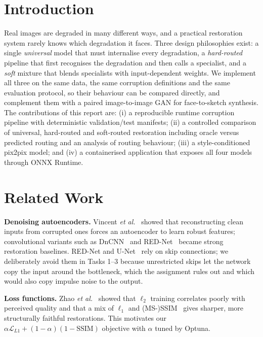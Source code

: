 \documentclass[conference]{IEEEtran}
\begin{document}
\section{Introduction}
Real images are degraded in many different ways, and a practical restoration system rarely knows which degradation it faces. Three design philosophies exist: a single \emph{universal} model that must internalise every degradation, a \emph{hard-routed} pipeline that first recognises the degradation and then calls a specialist, and a \emph{soft} mixture that blends specialists with input-dependent weights. We implement all three on the same data, the same corruption definitions and the same evaluation protocol, so their behaviour can be compared directly, and complement them with a paired image-to-image GAN for face-to-sketch synthesis. The contributions of this report are: (i) a reproducible runtime corruption pipeline with deterministic validation/test manifests; (ii) a controlled comparison of universal, hard-routed and soft-routed restoration including oracle versus predicted routing and an analysis of routing behaviour; (iii) a style-conditioned pix2pix model; and (iv) a containerised application that exposes all four models through ONNX Runtime.

\section{Related Work}
\textbf{Denoising autoencoders.} Vincent \emph{et al.}~\cite{vincent2008} showed that reconstructing clean inputs from corrupted ones forces an autoencoder to learn robust features; convolutional variants such as DnCNN~\cite{zhang2017dncnn} and RED-Net~\cite{mao2016red} became strong restoration baselines. RED-Net and U-Net~\cite{ronneberger2015} rely on skip connections; we deliberately avoid them in Tasks 1--3 because unrestricted skips let the network copy the input around the bottleneck, which the assignment rules out and which would also copy impulse noise to the output.

\textbf{Loss functions.} Zhao \emph{et al.}~\cite{zhao2017loss} showed that $\ell_2$ training correlates poorly with perceived quality and that a mix of $\ell_1$ and (MS-)SSIM~\cite{wang2004ssim} gives sharper, more structurally faithful restorations. This motivates our $\alpha\mathcal{L}_{L1}+(1-\alpha)(1-\text{SSIM})$ objective with $\alpha$ tuned by Optuna.
\end{document}
